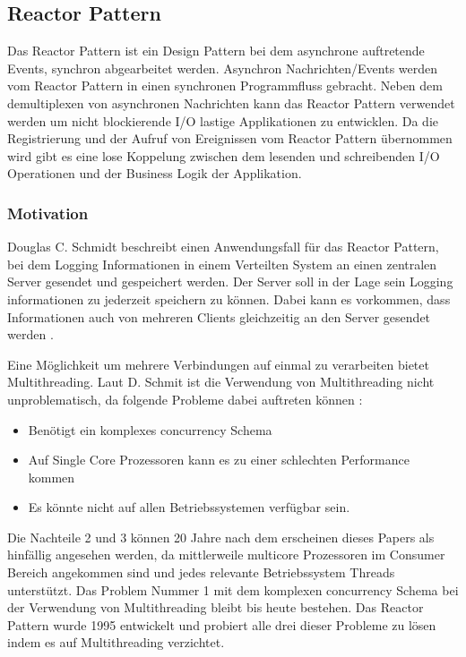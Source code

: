 \subsection{Reactor Pattern}
\label{section:Reactor Pattern}

Das Reactor Pattern ist ein Design Pattern bei dem asynchrone auftretende Events, synchron abgearbeitet werden. Asynchron Nachrichten/Events werden vom Reactor Pattern in einen synchronen Programmfluss gebracht. Neben dem demultiplexen von asynchronen Nachrichten kann das Reactor Pattern verwendet werden um nicht blockierende I/O lastige Applikationen zu entwicklen. Da die Registrierung und der Aufruf von Ereignissen vom Reactor Pattern übernommen wird gibt es eine lose Koppelung zwischen dem lesenden und schreibenden I/O Operationen und der Business Logik der Applikation. \cite[p. 1]{Sch95}

\subsubsection{Motivation}
\label{section:reactor_motivation}

Douglas C. Schmidt beschreibt einen Anwendungsfall für das Reactor Pattern, bei dem Logging Informationen in einem Verteilten System an einen zentralen Server gesendet und gespeichert werden. Der Server soll in der Lage sein Logging informationen zu jederzeit speichern zu können. Dabei kann es vorkommen, dass Informationen auch von mehreren Clients gleichzeitig an den Server gesendet werden \cite[p. 1]{Sch95}. 

Eine Möglichkeit um mehrere Verbindungen auf einmal zu verarbeiten bietet Multithreading. Laut D. Schmit ist die Verwendung von Multithreading nicht unproblematisch, da folgende Probleme dabei auftreten können \cite[p. 1]{Sch95}: 

\begin{itemize}
  \item Benötigt ein komplexes concurrency Schema
  \item Auf Single Core Prozessoren kann es zu einer schlechten Performance kommen
  \item Es könnte nicht auf allen Betriebssystemen verfügbar sein.
\end{itemize}

Die Nachteile 2 und 3 können 20 Jahre nach dem erscheinen dieses Papers als hinfällig angesehen werden, da mittlerweile multicore Prozessoren im Consumer Bereich angekommen sind und jedes relevante Betriebssystem Threads unterstützt. Das Problem Nummer 1 mit dem komplexen concurrency Schema bei der Verwendung von Multithreading bleibt bis heute bestehen. Das Reactor Pattern wurde 1995 entwickelt und probiert alle drei dieser Probleme zu lösen indem es auf Multithreading verzichtet.

